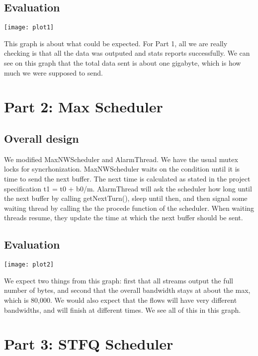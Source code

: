 \documentclass[11pt, letterpaper]{article}
\begin{document}
\subsection{Evaluation}

\centerline{\texttt{[image: plot1]}}

This graph is about what could be expected.  For Part 1, all we are really checking is that all the data was outputed and stats reports successfully.  
We can see on this graph that the total data sent is about one gigabyte, which is how much we were supposed to send.


\section{Part 2: Max Scheduler}

\subsection{Overall design}

We modified MaxNWScheduler and AlarmThread.  We have the usual mutex locks for syncrhonization.  MaxNWScheduler  waits on the condition until it is time to send the next buffer.  The next time is calculated as stated in the  project specification t1 = t0 + b0/m. AlarmThread will ask the scheduler how long until the next buffer by calling getNextTurn(), sleep until then, and then signal some waiting thread by calling the the procede function of the scheduler.  When waiting threads resume, they update the time at which the next buffer should be sent.



\subsection{Evaluation}

\centerline{\texttt{[image: plot2]}}

We expect two things from this graph: first that all streams output the full number of bytes, and second that the overall bandwidth stays at about the max, which is 80,000.  We would also expect that 
the flows will have very different bandwidths, and will finish at different times.  We see all of this in this graph.


\section{Part 3: STFQ Scheduler}
\end{document}
